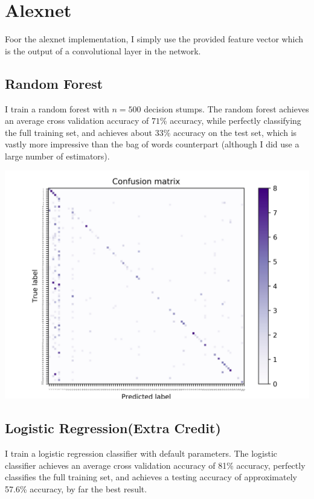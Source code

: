 \documentclass[]{article}
\begin{document}
\section{Alexnet}
Foor the alexnet implementation, I simply use the provided feature vector which is the output of a convolutional layer in the network.

\subsection{Random Forest}
I train a random forest with $n = 500$ decision stumps. The random forest achieves an average cross validation accuracy of $71$\% accuracy, while perfectly classifying the full training set, and achieves about $33$\% accuracy on the test set, which is vastly more impressive than the bag of words counterpart (although I did use a large number of estimators). 

\includegraphics[scale=0.10]{alex_net_random_forest_confusion_results.jpg}


\subsection{Logistic Regression(Extra Credit)}
I train a logistic regression classifier with default parameters. The logistic classifier achieves an average cross validation accuracy of 81\% accuracy, perfectly classifies the full training set, and achieves a testing accuracy of approximately 57.6\% accuracy, by far the best result.
\end{document}
